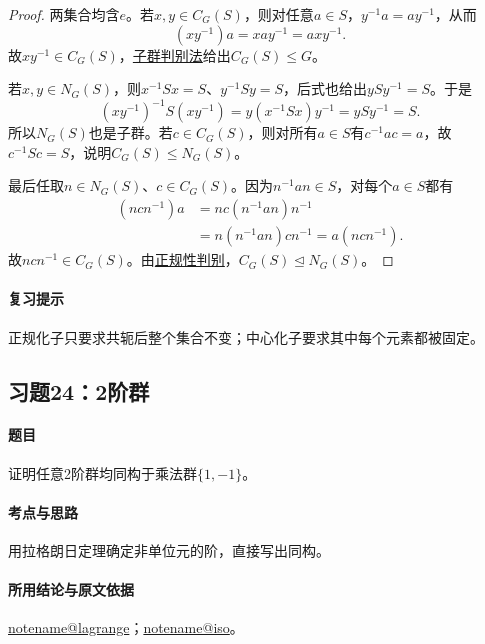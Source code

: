 \documentclass[UTF8,a4paper,11pt,fontset=windows]{ctexart}
\makeatletter
\newcommand{\noteref}[1]{\hyperref[note:#1]{\csname notename@#1\endcsname}}
\newcommand{\proofref}[2]{\hyperref[note:#1]{#2}}
\newcommand{\exref}[2]{\hyperref[ex:#1:#2]{第#1章习题#2}}
\makeatother
\begin{document}

\begin{proof}
两集合均含$e$。若$x,y\in C_G(S)$，则对任意$a\in S$，$y^{-1}a=ay^{-1}$，从而
\[
(xy^{-1})a=xay^{-1}=axy^{-1}.
\]
故$xy^{-1}\in C_G(S)$，\proofref{subgroup}{子群判别法}给出$C_G(S)\leq G$。

若$x,y\in N_G(S)$，则$x^{-1}Sx=S$、$y^{-1}Sy=S$，后式也给出$ySy^{-1}=S$。于是
\[
(xy^{-1})^{-1}S(xy^{-1})=y(x^{-1}Sx)y^{-1}=ySy^{-1}=S.
\]
所以$N_G(S)$也是子群。若$c\in C_G(S)$，则对所有$a\in S$有$c^{-1}ac=a$，故$c^{-1}Sc=S$，说明$C_G(S)\leq N_G(S)$。

最后任取$n\in N_G(S)$、$c\in C_G(S)$。因为$n^{-1}an\in S$，对每个$a\in S$都有
\begin{align*}
(ncn^{-1})a&=nc(n^{-1}an)n^{-1}\\
&=n(n^{-1}an)cn^{-1}=a(ncn^{-1}).
\end{align*}
故$ncn^{-1}\in C_G(S)$。由\proofref{normal}{正规性判别}，$C_G(S)\trianglelefteq N_G(S)$。
\end{proof}

\paragraph{复习提示}
正规化子只要求共轭后整个集合不变；中心化子要求其中每个元素都被固定。


\subsection{习题24：\texorpdfstring{2阶群}{2阶群}}
\label{ex:1:24}

\paragraph{题目}
证明任意2阶群均同构于乘法群$\{1,-1\}$。

\paragraph{考点与思路}
用拉格朗日定理确定非单位元的阶，直接写出同构。

\paragraph{所用结论与原文依据}
\noteref{lagrange}；\noteref{iso}。

\end{document}
